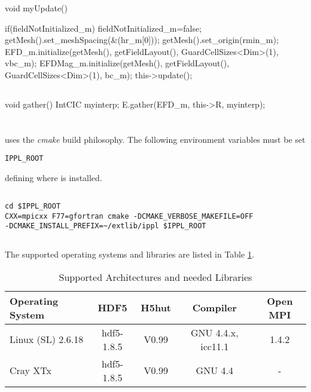  \begin{code}
void myUpdate() {

    if(fieldNotInitialized_m) {
         fieldNotInitialized_m=false;
         getMesh().set_meshSpacing(&(hr_m[0]));
         getMesh().set_origin(rmin_m);
         EFD_m.initialize(getMesh(), getFieldLayout(), GuardCellSizes<Dim>(1), vbc_m);
         EFDMag_m.initialize(getMesh(), getFieldLayout(), GuardCellSizes<Dim>(1), bc_m);
    }
    this->update();
}
\end{code}

  \subsection{}

\begin{code}
void gather() {
    IntCIC myinterp;
    E.gather(EFD_m, this->R, myinterp);
}
\end{code}

\section{}
 \ippl uses the {\em cmake } build philosophy.  The following environment variables must be set
\begin{verbatim}
IPPL_ROOT
\end{verbatim}
defining where \ippl is installed.

\subsection{}
\begin{verbatim}
cd $IPPL_ROOT
CXX=mpicxx F77=gfortran cmake -DCMAKE_VERBOSE_MAKEFILE=OFF
-DCMAKE_INSTALL_PREFIX=~/extlib/ippl $IPPL_ROOT
\end{verbatim}


\subsection{}
The supported operating systems and libraries are listed in Table \ref{tab:archlib}.
\begin{table}[h]
  \caption{Supported Architectures and needed Libraries}
  \label{tab:archlib}
  \begin{center}
    \begin{tabular}{|lcccc|}
      \hline
      Operating System & HDF5  & H5hut & Compiler & Open MPI\\
      \hline
      Linux (SL) 2.6.18 & hdf5-1.8.5 & V0.99 & GNU 4.4.x, icc11.1 & 1.4.2 \\
      Cray XTx  & hdf5-1.8.5 & V0.99 & GNU 4.4 & - \\
      \hline
    \end{tabular}
  \end{center}
\end{table}





